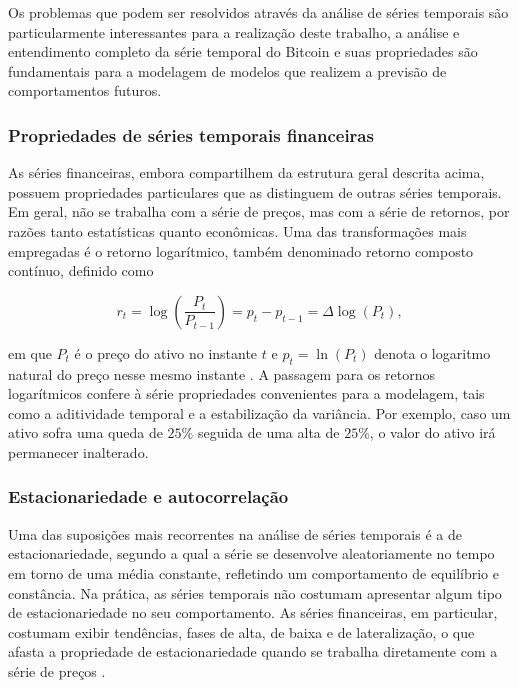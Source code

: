 \documentclass[
    12pt,                %
    openright,           %
    oneside,             %
    a4paper,             %
    english,             %
    brazil               %
]{abntex2}
\begin{document}
Os problemas que podem ser resolvidos através da análise de séries temporais são particularmente interessantes para a realização deste trabalho, a análise e entendimento completo da série temporal do Bitcoin e suas propriedades são fundamentais para a modelagem de modelos que realizem a previsão de comportamentos futuros.

\subsubsection{Propriedades de séries temporais financeiras}

As séries financeiras, embora compartilhem da estrutura geral descrita acima, possuem propriedades particulares que as distinguem de outras séries temporais. Em geral, não se trabalha com a série de preços, mas com a série de retornos, por razões tanto estatísticas quanto econômicas. Uma das transformações mais empregadas é o retorno logarítmico, também denominado retorno composto contínuo, definido como

\begin{equation}
    r_t = \log\!\left(\frac{P_t}{P_{t-1}}\right) = p_t - p_{t-1} = \Delta \log(P_t),
    \label{retorno_logaritmico}
\end{equation}

em que $P_t$ é o preço do ativo no instante $t$ e $p_t = \ln(P_t)$ denota o logaritmo natural do preço nesse mesmo instante \cite{morettin2018analise}. A passagem para os retornos logarítmicos confere à série propriedades convenientes para a modelagem, tais como a aditividade temporal e a estabilização da variância. Por exemplo, caso um ativo sofra uma queda de $25\%$ seguida de uma alta de $25\%$, o valor do ativo irá permanecer inalterado.

\subsubsection{Estacionariedade e autocorrelação}

Uma das suposições mais recorrentes na análise de séries temporais é a de estacionariedade, segundo a qual a série se desenvolve aleatoriamente no tempo em torno de uma média constante, refletindo um comportamento de equilíbrio e constância. Na prática, as séries temporais não costumam apresentar algum tipo de estacionariedade no seu comportamento. As séries financeiras, em particular, costumam exibir tendências, fases de alta, de baixa e de lateralização, o que afasta a propriedade de estacionariedade quando se trabalha diretamente com a série de preços \cite{morettin2018analise}.
\end{document}
